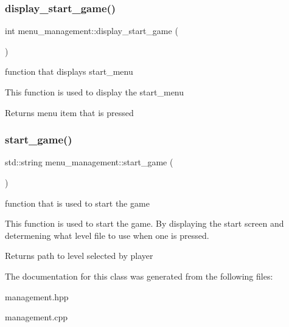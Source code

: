 \subsubsection{\texorpdfstring{display\+\_\+start\+\_\+game()}{display\_start\_game()}}
{\footnotesize\ttfamily int menu\+\_\+management\+::display\+\_\+start\+\_\+game (\begin{DoxyParamCaption}{ }\end{DoxyParamCaption})}



function that displays start\+\_\+menu 

This function is used to display the start\+\_\+menu

\begin{DoxyReturn}{Returns}
menu item that is pressed 
\end{DoxyReturn}
\mbox{\label{classmenu__management_a92d22f059d33ccc5c3ae485804fd5fbb}} 
\subsubsection{\texorpdfstring{start\+\_\+game()}{start\_game()}}
{\footnotesize\ttfamily std\+::string menu\+\_\+management\+::start\+\_\+game (\begin{DoxyParamCaption}{ }\end{DoxyParamCaption})}



function that is used to start the game 

This function is used to start the game. By displaying the start screen and determening what level file to use when one is pressed.

\begin{DoxyReturn}{Returns}
path to level selected by player 
\end{DoxyReturn}


The documentation for this class was generated from the following files\+:\begin{DoxyCompactItemize}
\item 
management.\+hpp\item 
management.\+cpp\end{DoxyCompactItemize}
